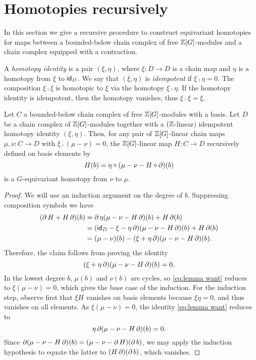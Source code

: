 
\section{Homotopies recursively}\label{s:equivariant homotopy general}

\noindent In this section we give a recursive procedure to construct equivariant homotopies for maps between a bounded-below chain complex of free $\mathbb{Z}[G]$-modules and a chain complex equipped with a contraction.

A \textit{homotopy identity} is a pair $(\xi,\eta)$, where $\xi \colon D \to D$ is a chain map and $\eta$ is a homotopy from $\xi$ to $\mathsf{id}_D$.
We say that $(\xi, \eta)$ is \textit{idempotent} if $\xi \comp \eta = 0$.
The composition $\xi \comp \xi$ is homotopic to $\xi$ via the homotopy $\xi \comp \eta$.
If the homotopy identity is idempotent, then the homotopy vanishes, thus $\xi \comp \xi = \xi$.

\begin{theorem}\label{t:recursive_homotopy}
	Let $C$ a bounded-below chain complex of free $\mathbb{Z}[G]$-modules with a basis.
	Let $D$ be a chain complex of $\mathbb{Z}[G]$-modules together with a $(\mathbb{Z}$-linear$)$ idempotent homotopy identity $(\xi, \eta)$.
	Then, for any pair of $\mathbb{Z}[G]$-linear chain maps $\mu,\nu \colon C \to D$ with $\xi \comp (\mu -\nu) = 0$, the $\mathbb{Z}[G]$-linear map $H \colon C \to D$ recursively defined on basis elements by
	\begin{equation}\label{eq:lemma def}
		H(b) = \eta \mathbin{\circ} (\mu - \nu - H \mathbin{\circ} \operatorname{\partial})(b)
	\end{equation}
	is a $G$-equivariant homotopy from $\nu$ to $\mu$.
\end{theorem}

\begin{proof}
	We will use an induction argument on the degree of $b$.
	Suppressing composition symbols we have
	\begin{align*}
		(\operatorname{\partial} H + H \operatorname{\partial})(b)
		&= \operatorname{\partial} \eta(\mu - \nu - H \operatorname{\partial})(b) + H \operatorname{\partial} (b) \\
		&= (\mathsf{id}_D - \xi - \eta \operatorname{\partial})(\mu - \nu - H \operatorname{\partial})(b) + H \operatorname{\partial}(b) \\
		&= (\mu-\nu)(b) - (\xi + \eta \operatorname{\partial})(\mu - \nu - H \operatorname{\partial})(b).
	\end{align*}
	Therefore, the claim follows from proving the identity
	\begin{equation}\label{eq:lemma want}
		(\xi + \eta \operatorname{\partial})(\mu - \nu - H \operatorname{\partial})(b) = 0.
	\end{equation}
	In the lowest degree $b$, $\mu(b)$ and $\nu(b)$ are cycles, so \eqref{eq:lemma want} reduces to $\xi(\mu-\nu) = 0$, which gives the base case of the induction.	For the induction step, observe first that $\xi H$ vanishes on basis elements because $\xi\eta = 0$, and thus vanishes on all elements. As $\xi (\mu-\nu) = 0$, the identity \eqref{eq:lemma want} reduces to
    \[
        \eta\operatorname{\partial}(\mu-\nu-H\operatorname{\partial})(b) = 0.
     \]
    Since $\operatorname{\partial}(\mu-\nu-H\operatorname{\partial})(b) = (\mu-\nu-\operatorname{\partial} H)(\operatorname{\partial} b)$, we may apply the induction hypothesis to equate the latter to $(H\operatorname{\partial})(\operatorname{\partial} b)$, which vanishes.
\end{proof}

